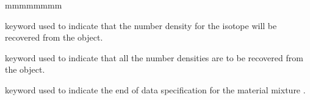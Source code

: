 \begin{ListeDeDescription}{mmmmmmmm}
\item[\moc{*}] keyword used to indicate that the number density for the
isotope  will be recovered from the  object.

\item[\moc{ALL}] keyword used to indicate that all the number densities are to
be recovered from the  object.

\item[\moc{ENDMIX}] keyword used to indicate the end of data specification
for the material mixture .

\end{ListeDeDescription}
\clearpage
